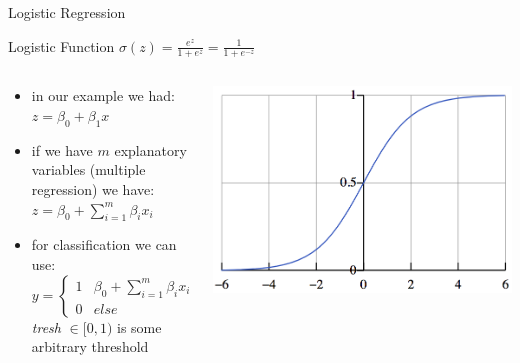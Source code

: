 \documentclass{beamer}
\begin{document}
\begin{frame}{Logistic Regression}

\begin{block}{Logistic Function}
$\sigma(z) = \frac{e^z}{1+e^z} = \frac{1}{1+e^{-z}}$ 
\end{block}



\begin{columns}

\begin{column}{0.7\textwidth}
\begin{itemize}
\item in our example we had:\\ 
$z=\beta_0+ \beta_1x$
\item if we have $m$ explanatory variables (multiple regression) we have:\\ 
$z=\beta_0 + \sum_{i=1}^{m} \beta_i x_i$
\item for classification we can use:
$$
y=
\begin{cases}
1 & \beta_0 + \sum_{i=1}^{m} \beta_i x_i > thresh\\
0 & else
\end{cases}
$$
\emph{tresh} $\in [0,1)$ is some arbitrary threshold


\end{itemize}
\end{column}

\begin{column}{0.3\textwidth}
	\includegraphics[width=1.1\textwidth]{logisticfunc}
\end{column}
\end{columns}
\end{frame}
\end{document}
